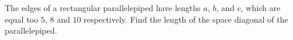 The edges of a rectangular parallelepiped have lengths $a$, $b$, and $c$, which are equal too $5$, $8$ and $10$ respectively. Find the length of the space diagonal of the parallelepiped.
